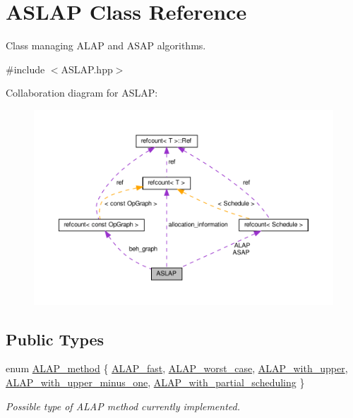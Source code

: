 \hypertarget{classASLAP}{}\section{A\+S\+L\+AP Class Reference}
\label{classASLAP}


Class managing A\+L\+AP and A\+S\+AP algorithms.  




{\ttfamily \#include $<$A\+S\+L\+A\+P.\+hpp$>$}



Collaboration diagram for A\+S\+L\+AP\+:
\nopagebreak
\begin{figure}[H]
\begin{center}
\leavevmode
\includegraphics[width=350pt]{d3/d59/classASLAP__coll__graph}
\end{center}
\end{figure}
\subsection*{Public Types}
\begin{DoxyCompactItemize}
\item 
enum \hyperlink{classASLAP_a091a7ef2aa403de3cabf4275cd1eb211}{A\+L\+A\+P\+\_\+method} \{ \newline
\hyperlink{classASLAP_a091a7ef2aa403de3cabf4275cd1eb211a2c30e42df216d4d3e1c3a46ffaea6260}{A\+L\+A\+P\+\_\+fast}, 
\hyperlink{classASLAP_a091a7ef2aa403de3cabf4275cd1eb211af64abc9d0aa98bc47e039dcf73b70eb7}{A\+L\+A\+P\+\_\+worst\+\_\+case}, 
\hyperlink{classASLAP_a091a7ef2aa403de3cabf4275cd1eb211aa8f8393e062ebaf2839d2ecb0561273b}{A\+L\+A\+P\+\_\+with\+\_\+upper}, 
\hyperlink{classASLAP_a091a7ef2aa403de3cabf4275cd1eb211a2763470ecdad26d244adf865e6c0ddb1}{A\+L\+A\+P\+\_\+with\+\_\+upper\+\_\+minus\+\_\+one}, 
\newline
\hyperlink{classASLAP_a091a7ef2aa403de3cabf4275cd1eb211a5bf0d563c223d2a3b6eb197aface4013}{A\+L\+A\+P\+\_\+with\+\_\+partial\+\_\+scheduling}
 \}\begin{DoxyCompactList}\small\item\em Possible type of A\+L\+AP method currently implemented. \end{DoxyCompactList}
\end{DoxyCompactItemize}
